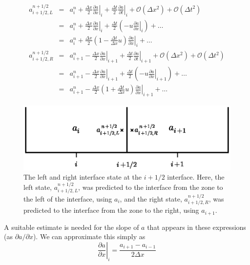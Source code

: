 \documentclass[11pt]{article}
\begin{document}
\begin{eqnarray}
a_{i+1/2,L}^{n+1/2} &=& a_i^n + \frac{\Delta x}{2} \left .\frac{\partial a}{\partial x} \right |_i + \frac{\Delta t}{2} \left .\frac{\partial a}{\partial t} \right |_i + \mathcal{O}(\Delta x^2) + \mathcal{O}(\Delta t^2) \nonumber \\
    &=& a_i^n + \frac{\Delta x}{2} \left .\frac{\partial a}{\partial x} \right |_i +  \frac{\Delta t}{2} \left ( - u \left .\frac{\partial a}{\partial x} \right |_i \right ) + \ldots \nonumber \\
    &=& a_i^n + \frac{\Delta x}{2} \left ( 1 - \frac{\Delta t}{\Delta x} u \right ) \left .\frac{\partial a}{\partial x} \right |_i +  \ldots \label{eq:statel}\\
a_{i+1/2,R}^{n+1/2} &=& a_{i+1}^n - \frac{\Delta x}{2} \left .\frac{\partial a}{\partial x} \right |_{i+1} + \frac{\Delta t}{2} \left .\frac{\partial a}{\partial t} \right |_{i+1} + \mathcal{O}(\Delta x^2) + \mathcal{O}(\Delta t^2) \nonumber \\
    &=& a_{i+1}^n - \frac{\Delta x}{2} \left .\frac{\partial a}{\partial x} \right |_{i+1} +  \frac{\Delta t}{2} \left ( - u \left .\frac{\partial a}{\partial x} \right |_{i+1} \right ) + \ldots \nonumber \\
    &=& a_{i+1}^n - \frac{\Delta x}{2} \left ( 1 + \frac{\Delta t}{\Delta x} u \right ) \left .\frac{\partial a}{\partial x} \right |_{i+1} +  \ldots \label{eq:stater}
\end{eqnarray}
\begin{figure}[t]
\centering
\includegraphics[width=5.0in]{riemann}
\caption{\label{fig:riemann} The left and right interface state at the
  $i+1/2$ interface.  Here, the left state, $a_{i+1/2,L}^{n+1/2}$, was
  predicted to the interface from the zone to the left of the
  interface, using $a_i$, and the right state, $a_{i+1/2,R}^{n+1/2}$,
  was predicted to the interface from the zone to the right, using
  $a_{i+1}$.}
\end{figure}

A suitable estimate is needed for the slope of $a$ that appears in these 
expressions (as $\partial a/\partial x$).  We can approximate this simply
as 
\begin{equation}
\left . \frac{\partial a}{\partial x}\right |_i = \frac{a_{i+1} - a_{i-1}}{2 \Delta x} \label{eq:slopecentered}
\end{equation}
\end{document}
